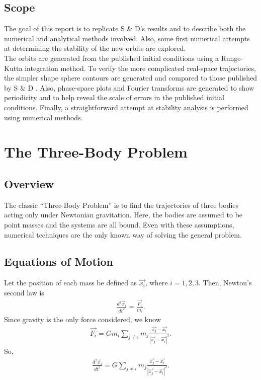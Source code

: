 \documentclass[12pt]{article}
\begin{document}
\subsection{Scope}
The goal of this report is to replicate S \& D's results and to describe both the numerical and analytical methods involved. Also, some first numerical attempts at determining the stability of the new orbits are explored. \\

The orbits are generated from the published initial conditions using a Runge-Kutta integration method. To verify the more complicated real-space trajectories, the simpler shape sphere contours are generated and compared to those published by S \& D \cite{3bsite}. Also, phase-space plots and Fourier transforms are generated to show periodicity and to help reveal the scale of errors in the published initial conditions. Finally, a straightforward attempt at stability analysis is performed using numerical methods.

\section{The Three-Body Problem}
\subsection{Overview}
The classic ``Three-Body Problem'' is to find the trajectories of three bodies acting only under Newtonian gravitation. Here, the bodies are assumed to be point masses and the systems are all bound. Even with these assumptions, numerical techniques are the only known way of solving the general problem.
\subsection{Equations of Motion}
Let the position of each mass be defined as $\vec{x_i}$, where $i = 1,2,3$. Then, Newton's second law is
\begin{align*}
\frac{d^2\vec{x}_i}{dt^2} = \frac{\vec{F_i}}{{m_i}}.
\end{align*}
Since gravity is the only force considered, we know
\begin{align*}
\vec{F_i} = G m_i \sum_{j \neq i} m_j \frac{\vec{x_j}-\vec{x_i}}{|\vec{x_j}-\vec{x_i}|^3}.
\end{align*}
So,
\begin{align*}
\frac{d^2\vec{x}_i}{dt^2} = G \sum_{j \neq i} m_j \frac{\vec{x_j}-\vec{x_i}}{|\vec{x_j}-\vec{x_i}|^3}.
\end{align*}
\end{document}
